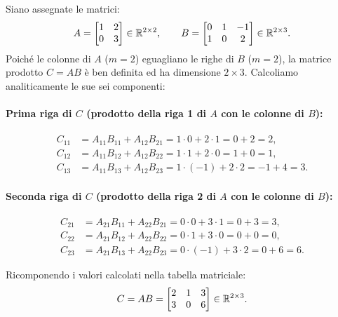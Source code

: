 \begin{example}
Siano assegnate le matrici:
\begin{equation}
    A = \begin{bmatrix} 1 & 2 \\ 0 & 3 \end{bmatrix} \in \mathbb{R}^{2 \times 2}, \qquad B = \begin{bmatrix} 0 & 1 & -1 \\ 1 & 0 & 2 \end{bmatrix} \in \mathbb{R}^{2 \times 3}.
\end{equation}
Poich\'e le colonne di $A$ ($m = 2$) eguagliano le righe di $B$ ($m = 2$), la matrice prodotto $C = AB$ \`e ben definita ed ha dimensione $2 \times 3$. Calcoliamo analiticamente le sue sei componenti:

\paragraph{Prima riga di $C$ (prodotto della riga 1 di $A$ con le colonne di $B$):}
\begin{align}
    C_{11} &= A_{11}B_{11} + A_{12}B_{21} = 1 \cdot 0 + 2 \cdot 1 = 0 + 2 = 2, \\
    C_{12} &= A_{11}B_{12} + A_{12}B_{22} = 1 \cdot 1 + 2 \cdot 0 = 1 + 0 = 1, \\
    C_{13} &= A_{11}B_{13} + A_{12}B_{23} = 1 \cdot (-1) + 2 \cdot 2 = -1 + 4 = 3.
\end{align}

\paragraph{Seconda riga di $C$ (prodotto della riga 2 di $A$ con le colonne di $B$):}
\begin{align}
    C_{21} &= A_{21}B_{11} + A_{22}B_{21} = 0 \cdot 0 + 3 \cdot 1 = 0 + 3 = 3, \\
    C_{22} &= A_{21}B_{12} + A_{22}B_{22} = 0 \cdot 1 + 3 \cdot 0 = 0 + 0 = 0, \\
    C_{23} &= A_{21}B_{13} + A_{22}B_{23} = 0 \cdot (-1) + 3 \cdot 2 = 0 + 6 = 6.
\end{align}

Ricomponendo i valori calcolati nella tabella matriciale:
\begin{equation}
    C = AB = \begin{bmatrix} 2 & 1 & 3 \\ 3 & 0 & 6 \end{bmatrix} \in \mathbb{R}^{2 \times 3}.
\end{equation}
\end{example}

